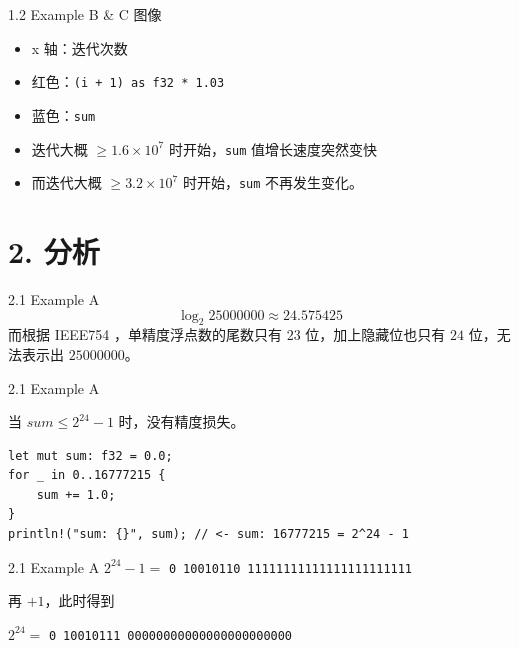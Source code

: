 \documentclass{beamer}
\newcommand{\Sign}[1]{\textcolor{SignColor}{\texttt{#1}}}
\newcommand{\Exp}[1]{\textcolor{ExpColor}{\texttt{#1}}}
\newcommand{\Mant}[1]{\textcolor{MantColor}{\texttt{#1}}}
\newcommand{\BitLineNoGRS}[3]{\Sign{#1}\ \Exp{#2}\ \Mant{#3}}
\begin{document}
\begin{frame}{1.2 Example B \& C 图像}
\begin{center}
\makebox[\textwidth][c]{%
}%
\end{center}
\pause
\begin{itemize}
  \item x 轴：迭代次数
  \item 红色：\texttt{(i + 1) as f32 * 1.03}
  \item 蓝色：\texttt{sum}
  \item 迭代大概 $\ge 1.6\times 10^7$ 时开始，\texttt{sum} 值增长速度突然变快
  \item 而迭代大概 $\ge 3.2\times 10^7$ 时开始，\texttt{sum} 不再发生变化。
\end{itemize}
\end{frame}

\section{2. 分析}

\begin{frame}{2.1 Example A}
\[
\log_2{25000000} \approx 24.575425
\]
\pause
而根据 IEEE754 ，单精度浮点数的尾数只有 $23$ 位，加上隐藏位也只有 $24$ 位，无法表示出 $25000000$。
\end{frame}

\begin{frame}[fragile]{2.1 Example A}

当 $sum \le 2^{24}-1$ 时，没有精度损失。

\pause

\begin{lstlisting}
let mut sum: f32 = 0.0;
for _ in 0..16777215 {
    sum += 1.0;
}
println!("sum: {}", sum); // <- sum: 16777215 = 2^24 - 1
\end{lstlisting}
\end{frame}

\begin{frame}{2.1 Example A}
$2^{24} - 1 =$ \BitLineNoGRS{0}{10010110}{11111111111111111111111}
\pause

\vspace{0.5em}

再 $+1$，此时得到

\vspace{0.5em}

$2^{24} =$ \BitLineNoGRS{0}{10010111}{00000000000000000000000}
\end{frame}
\end{document}
